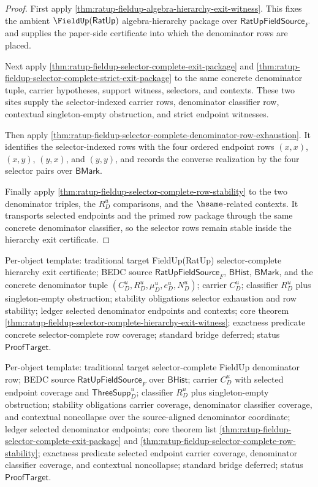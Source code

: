 \begin{proof}
First apply \autoref{thm:ratup-fieldup-algebra-hierarchy-exit-witness}. This
fixes the ambient $\FieldUp(\mathsf{RatUp})$ algebra-hierarchy package over
$\mathsf{RatUpFieldSource}_F$ and supplies the paper-side certificate into which
the denominator rows are placed.

Next apply \autoref{thm:ratup-fieldup-selector-complete-exit-package} and
\autoref{thm:ratup-fieldup-selector-complete-strict-exit-package} to the same
concrete denominator tuple, carrier hypotheses, support witness, selectors, and
contexts. These two sites supply the selector-indexed carrier rows, denominator
classifier row, contextual singleton-empty obstruction, and strict endpoint
witnesses.

Then apply
\autoref{thm:ratup-fieldup-selector-complete-denominator-row-exhaustion}. It
identifies the selector-indexed rows with the four ordered endpoint rows
$(x,x)$, $(x,y)$, $(y,x)$, and $(y,y)$, and records the converse realization by
the four selector pairs over $\mathsf{BMark}$.

Finally apply \autoref{thm:ratup-fieldup-selector-complete-row-stability} to the
two denominator triples, the $R_D^u$ comparisons, and the
$\hsame$-related contexts. It transports selected endpoints and the primed row
package through the same concrete denominator classifier, so the selector rows
remain stable inside the hierarchy exit certificate.
\end{proof}

Per-object template: traditional target FieldUp(RatUp) selector-complete
hierarchy exit certificate; BEDC source $\mathsf{RatUpFieldSource}_F$,
$\mathsf{BHist}$, $\mathsf{BMark}$, and the concrete denominator tuple
$(C_D^u,R_D^u,\mu_D^u,e_D^u,N_D^u)$; carrier $C_D^u$; classifier $R_D^u$ plus
singleton-empty obstruction; stability obligations selector exhaustion and row
stability; ledger selected denominator endpoints and contexts; core theorem
\autoref{thm:ratup-fieldup-selector-complete-hierarchy-exit-witness}; exactness
predicate concrete selector-complete row coverage; standard bridge deferred;
status $\mathsf{ProofTarget}$.

Per-object template: traditional target selector-complete FieldUp denominator
row; BEDC source $\mathsf{RatUpFieldSource}_F$ over $\mathsf{BHist}$; carrier
$C_D^u$ with selected endpoint coverage and $\mathsf{ThreeSupp}_D^u$;
classifier $R_D^u$ plus singleton-empty obstruction; stability obligations
carrier coverage, denominator classifier coverage, and contextual noncollapse
over the source-aligned denominator coordinate; ledger selected denominator
endpoints; core theorem list
\autoref{thm:ratup-fieldup-selector-complete-exit-package} and
\autoref{thm:ratup-fieldup-selector-complete-row-stability}; exactness
predicate selected endpoint carrier coverage, denominator classifier coverage,
and contextual noncollapse; standard bridge deferred; status
$\mathsf{ProofTarget}$.
